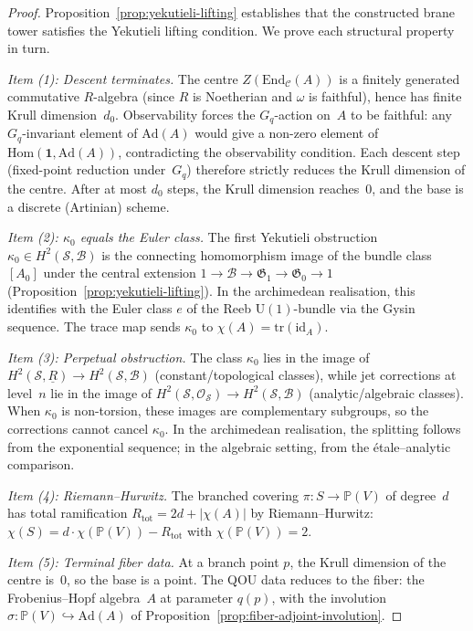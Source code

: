 \begin{proof}
Proposition~\ref{prop:yekutieli-lifting} establishes that the constructed
brane tower satisfies the Yekutieli lifting condition.  We prove each
structural property in turn.

\emph{Item (1): Descent terminates.}\;
The centre $Z(\mathrm{End}_{\mathcal{C}}(A))$ is a finitely generated
commutative $R$-algebra (since $R$ is Noetherian and $\omega$ is faithful),
hence has finite Krull dimension~$d_0$.  Observability forces the $G_q$-action
on~$A$ to be faithful: any $G_q$-invariant element of $\mathrm{Ad}(A)$ would
give a non-zero element of $\mathrm{Hom}(\mathbf{1}, \mathrm{Ad}(A))$,
contradicting the observability condition.  Each descent step (fixed-point
reduction under~$G_q$) therefore strictly reduces the Krull dimension of the
centre.  After at most $d_0$ steps, the Krull dimension reaches~$0$, and the
base is a discrete (Artinian) scheme.

\emph{Item (2): $\kappa_0$ equals the Euler class.}\;
The first Yekutieli obstruction $\kappa_0 \in H^2(\mathcal{S}, \mathcal{B})$
is the connecting homomorphism image of the bundle class $[A_0]$ under the
central extension $1 \to \mathcal{B} \to \mathfrak{G}_1 \to \mathfrak{G}_0
\to 1$ (Proposition~\ref{prop:yekutieli-lifting}).  In the archimedean
realisation, this identifies with the Euler class $e$ of the Reeb
$\mathrm{U}(1)$-bundle via the Gysin sequence.  The trace map sends
$\kappa_0$ to $\chi(A) = \mathrm{tr}(\mathrm{id}_A)$.

\emph{Item (3): Perpetual obstruction.}\;
The class $\kappa_0$ lies in the image of $H^2(\mathcal{S}, \underline{R})
\to H^2(\mathcal{S}, \mathcal{B})$ (constant/topological classes), while jet
corrections at level~$n$ lie in the image of $H^2(\mathcal{S},
\mathcal{O}_{\mathcal{S}}) \to H^2(\mathcal{S}, \mathcal{B})$ (analytic/algebraic
classes).  When $\kappa_0$ is non-torsion, these images are complementary
subgroups, so the corrections cannot cancel $\kappa_0$.  In the archimedean
realisation, the splitting follows from the exponential sequence; in the
algebraic setting, from the \'etale--analytic comparison.

\emph{Item (4): Riemann--Hurwitz.}\;
The branched covering $\pi \colon S \to \mathbb{P}(V)$ of degree~$d$ has
total ramification $R_{\mathrm{tot}} = 2d + \lvert\chi(A)\rvert$ by
Riemann--Hurwitz: $\chi(S) = d \cdot \chi(\mathbb{P}(V)) - R_{\mathrm{tot}}$
with $\chi(\mathbb{P}(V)) = 2$.

\emph{Item (5): Terminal fiber data.}\;
At a branch point $p$, the Krull dimension of the centre is~$0$, so the base
is a point.  The QOU data reduces to the fiber: the Frobenius--Hopf
algebra~$A$ at parameter $q(p)$, with the involution
$\sigma \colon \mathbb{P}(V) \hookrightarrow \mathrm{Ad}(A)$ of
Proposition~\ref{prop:fiber-adjoint-involution}.
\end{proof}

